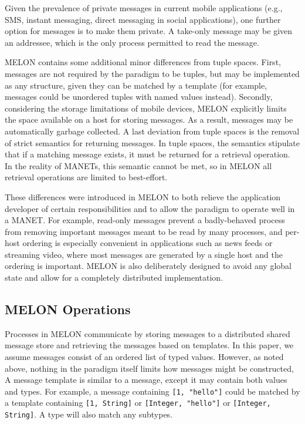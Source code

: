 \documentclass{llncs}
\begin{document}
Given the prevalence of private messages in current mobile applications (e.g., SMS, instant messaging, direct messaging in social applications), one further option for messages is to make them private. A take-only message may be given an addressee, which is the only process permitted to read the message.

MELON contains some additional minor differences from tuple spaces. First, messages are not required by the paradigm to be tuples, but may be implemented as any structure, given they can be matched by a template (for example, messages could be unordered tuples with named values instead). Secondly, considering the storage limitations of mobile devices, MELON explicitly limits the space available on a host for storing messages. As a result, messages may be automatically garbage collected. A last deviation from tuple spaces is the removal of strict semantics for returning messages. In tuple spaces, the semantics stipulate that if a matching message exists, it must be returned for a retrieval operation. In the reality of MANETs, this semantic cannot be met, so in MELON all retrieval operations are limited to best-effort.

These differences were introduced in MELON to both relieve the application developer of certain responsibilities and to allow the paradigm to operate well in a MANET. For example, read-only messages prevent a badly-behaved process from removing important messages meant to be read by many processes, and per-host ordering is especially convenient in applications such as news feeds or streaming video, where most messages are generated by a single host and the ordering is important. MELON is also deliberately designed to avoid any global state and allow for a completely distributed implementation.

\subsection{MELON Operations}

Processes in MELON communicate by storing messages to a distributed shared message store and retrieving the messages based on templates. In this paper, we assume messages consist of an ordered list of typed values. However, as noted above, nothing in the paradigm itself limits how messages might be constructed,  A message template is similar to a message, except it may contain both values and types. For example, a message containing \texttt{[1, "hello"]} could be matched by a template containing \texttt{[1, String]} or \texttt{[Integer, "hello"]} or \texttt{[Integer, String]}. A type will also match any subtypes.
\end{document}
